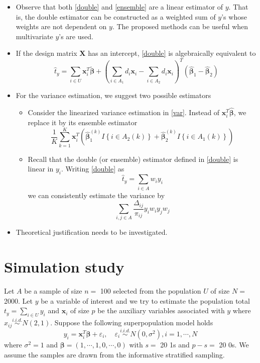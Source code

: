 \documentclass[12pt]{article}
\renewcommand{\bf}[1]{\boldsymbol{\mathbf{#1}}}
\newcommand{\set}[1]{\left\{#1\right\}} %
\newcommand{\pa}[1]{\left(#1\right)} %
\newcommand{\iid}{\stackrel{i.i.d.}{\sim}}
\begin{document}
\begin{itemize}
  That is, for each of the random sample $A_1(1), \cdots, A_1(K)$ and $A_2(1), \cdots, A_2(K)$ the final ensemble estimator is defined as
  \begin{equation}
      \hat t_y = \frac{1}{K}\sum_{k = 1}^K \hat t_y(A_1(k), A_2(k)) \label{ensemble}
  \end{equation}
  \item Observe that both \eqref{double} and \eqref{ensemble} are a linear estimator of $y$. That is, the double estimator can be constructed as a weighted sum of $y$'s whose weights are not dependent on $y$. The proposed methods can be useful when multivariate $y$'s are used.
  \item If the design matrix $\bf X$ has an intercept, \eqref{double} is algebraically equivalent to
  $$
  \hat t_y = \sum_{i \in U}\bf x_i^T\tilde {\bf \beta} + \pa{\sum_{i \in A_1} d_i \bf x_i - \sum_{i \in A_2} d_i \bf x_i}^T \pa{\hat{\bf \beta}_1 - \hat{\bf \beta}_2}
  $$
  \item For the variance estimation, we suggest two possible estimators
  \begin{itemize}
      \item Consider the linearized variance estimation in \eqref{var}. Instead of $\bf x_i^T \hat {\bf \beta}$, we replace it by its ensemble estimator
      $$
      \frac{1}{K} \sum_{k = 1}^K \bf x_i^T\pa{\hat {\bf \beta}^{(k)}_1 I\set{i \in A_2(k)} + \hat {\bf \beta}^{(k)}_2 I\set{i \in A_1(k)}}
      $$
      \item Recall that the double (or ensemble) estimator defined in \eqref{double} is linear in $y_i$. Writing \eqref{double} as
      $$
      \hat t_y = \sum_{i \in A} w_i y_i
      $$
      we can consistently estimate the variance by
      $$
      \sum_{i,j \in A} \frac{\Delta_{ij}}{\pi_{ij}} y_i w_i y_j w_j
      $$
  \end{itemize}
  \item Theoretical justification needs to be investigated.
\end{itemize}




\section{Simulation study}

Let \(A\) be a sample of size \(n =\) 100 selected from the population
\(U\) of size \(N =\) 2000. Let \(y\) be a variable of interest and we
try to estimate the population total \(t_y = \sum_{i \in U} y_i\) and
\(\bf x_{i}\) of size \(p\) be the auxiliary variables associated with
\(y\) where \(x_{ij} \iid N(2, 1)\). Suppose the following
superpopulation model holds \[
y_i = \bf x_i^T \bf \beta + \varepsilon_i, \quad \varepsilon_i \iid N(0,\sigma^2), i = 1, \cdots, N
\] where \(\sigma^2 = 1\) and
\(\bf \beta = (1, \cdots, 1, 0, \cdots, 0)\) with \(s =\) 20 1s and
\(p - s =\) 20 0s. We assume the samples are drawn from the informative stratified sampling.
\end{document}
